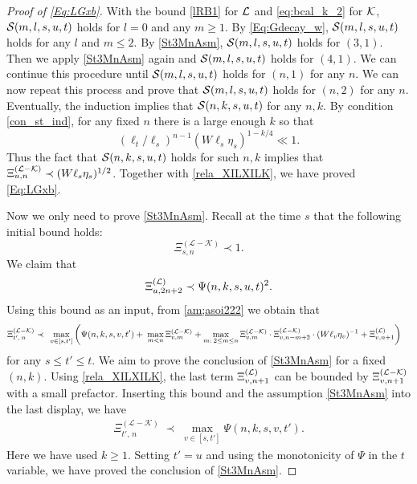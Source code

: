 \documentclass[10pt,reqno]{article}
\theoremstyle{plain} %
\theoremstyle{remark}
\numberwithin{equation}{section}
\begin{document}
\begin{proof}[Proof of \eqref{Eq:LGxb}]
With the bound \eqref{lRB1} for $\cal L$ and \eqref{eq:bcal_k_2} for $\cal K$, 
${\cal S}(m, l,s,u,t)$  holds for $l=0$ and any  $m\ge 1$. 
By  \eqref{Eq:Gdecay_w}, 
${\cal S}(m, l,s,u,t)$ holds for any $l$ and $m\le 2$. By \eqref{St3MnAsm}, ${\cal S}(m, l,s,u,t)$ holds for $(3, 1)$. 
Then we apply  \eqref{St3MnAsm} again and ${\cal S}(m, l,s,u,t)$ holds for $(4, 1)$. We can continue this procedure until 
${\cal S}(m, l,s,u,t)$ holds for  $(n, 1)$ for any $n$. We can now repeat this process and prove that ${\cal S}(m, l,s,u,t)$ holds for  $(n, 2)$ for any $n$. Eventually, the induction implies that ${\cal S}(n, k,s,u,t)$ for any $n, k$. 
By   condition \eqref{con_st_ind}, for any fixed $n$  there is a large enough $k$ so that 
$$
 (\ell_t/\ell_s)^{n-1}(W\ell_s\eta_s)^{1 -k/4} \ll  1.
$$
Thus the fact that $ {\cal S}(n,k,s,u,t)$ holds for such $n, k$ implies that 
$\Xi^{({\cal L-K})}_{ u,n}\prec (W\ell_s\eta_s)^{1/2}$. Together with   \eqref{rela_XILXILK}, we have proved   \eqref{Eq:LGxb}. 

Now we only need to prove \eqref{St3MnAsm}. Recall 
at the time $s$ that the following initial bound holds: 
\begin{equation}\label{inasfua}
    \Xi_{s,n }^{(\mathcal{L}-\mathcal{K})} \prec 1.
\end{equation}
We claim that 
 \begin{align} \label{xiu2n+2psi}
    \Xi^{({\cal L})}_{u, 2n+2}
 \prec \Psi(n,k,s,u,t)^2.
\end{align}
Using  this bound as an input, from  \eqref{am;asoi222} we obtain that 
\begin{align} \label{sadui_w0}
 \Xi_{t',\,n }^{(\mathcal{L}-\mathcal{K})}  \prec\;  &\; \max_{v\in [s,t']}
  \left(\Psi(n,k,s,v,t')+\; \max_{m<n }\Xi^{({\cal L-\cal K})}_{v,m}+\max_{m:\;2\le m\le n }\Xi^{({\cal L-\cal K})}_{v,m}\cdot \Xi^{({\cal L-\cal K})}_{v,n-m+2}\cdot(W\ell_v\eta_v)^{-1}+\Xi^{({\cal L})}_{v,n+1}\right)
 \end{align}
 for any $s \le t' \le t$.  We aim to prove the conclusion of  \eqref{St3MnAsm} for a fixed $(n, k)$.  Using \eqref{rela_XILXILK}, the last term $ \Xi^{({\cal L})}_{v,n+1}$ can be bounded by $ \Xi^{{(\cal L-\cal K})}_{v,n+1}$ with a  small prefactor.  
Inserting  this  bound and the assumption \eqref{St3MnAsm} into the last display,  we have 
\begin{align}\label{sadui-w}
    \Xi_{t',\,n }^{(\mathcal{L}-\mathcal{K})} \; \prec\; \max_{v\in[s,t']}\Psi(n,k ,s,v,t').
\end{align}
Here we have used $k\ge 1$.  Setting $t'=u$ and using the monotonicity of $\Psi$ in the $t$ variable, we have proved  the conclusion of  \eqref{St3MnAsm}. 


\end{proof}
\end{document}
